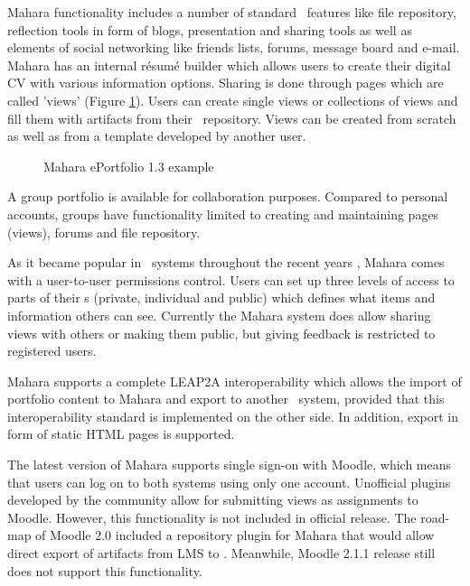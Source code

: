 Mahara functionality includes a number of standard \ep~features like file
repository, reflection tools in form of blogs, presentation and sharing tools as
well as elements of social networking like friends lists, forums, message board
and e-mail. Mahara has an internal r\'{e}sum\'{e} builder which allows users to
create their digital CV with various information options. Sharing is done
through pages which are called 'views' (Figure \ref{fig:maharaep}). Users can
create single views or collections of views and fill them with artifacts from
their \ep~repository. Views can be created from scratch as well as from a
template developed by another user.

\begin{figure}[htb]
\centering
\setlength\fboxsep{0pt}
\setlength\fboxrule{0.5pt}
\caption{Mahara ePortfolio 1.3 example}
\label{fig:maharaep}
\end{figure}

A group portfolio is available for collaboration purposes. Compared to personal
accounts, groups have functionality limited to creating and maintaining pages
(views), forums and file repository.

As it became popular in \ep~systems throughout the recent years
\citep{Waters2009}, Mahara comes with a user-to-user permissions control. Users
can set up three levels of access to parts of their \ep s (private, individual
and public) which defines what items and information others can see. Currently
the Mahara system does allow sharing views with others or making them public,
but giving feedback is restricted to registered users.

Mahara supports a complete LEAP2A interoperability
\citep{MaharaGovernanceGroup2011} which allows the import of portfolio content
to Mahara and export to another \ep~system, provided that this interoperability
standard is implemented on the other side. In addition, export in form of static
HTML pages is supported.

The latest version of Mahara supports single sign-on with Moodle, which means
that users can log on to both systems using only one account. Unofficial plugins
developed by the community allow for submitting views as assignments to Moodle.
However, this functionality is not included in official release. The road-map of
Moodle 2.0 included a repository plugin for Mahara that would allow direct
export of artifacts from LMS to \ep. Meanwhile, Moodle 2.1.1 release still does
not support this functionality.

